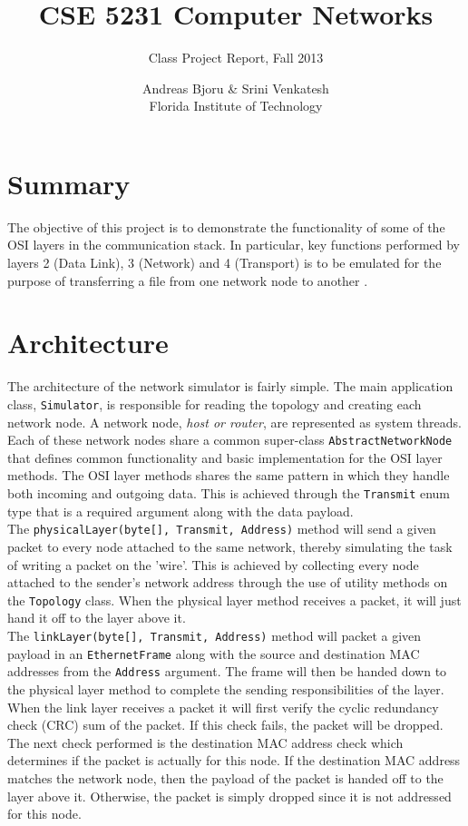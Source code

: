 \documentclass{scrartcl}
\begin{document}
\author{Andreas Bjoru \& Srini Venkatesh\\ Florida Institute of Technology}
\title{CSE 5231 Computer Networks}
\subtitle{Class Project Report, Fall 2013}
\renewcommand{\today}{November 26, 2013}
\maketitle
\tableofcontents
\newpage

\section{Summary}
The objective of this project is to demonstrate the functionality of some of the OSI layers in the communication stack. In particular, key functions performed by layers 2 (Data Link), 3 (Network) and 4 (Transport) is to be emulated for the purpose of transferring a file from one network node to another \cite{assignment}. 

\section{Architecture}
The architecture of the network simulator is fairly simple. The main application class, \texttt{Simulator}, is responsible for reading the topology and creating each network node. A network node, \textit{host or router}, are represented as system threads. Each of these network nodes share a common super-class \texttt{AbstractNetworkNode} that defines common functionality and basic implementation for the OSI layer methods. The OSI layer methods shares the same pattern in which they handle both incoming and outgoing data. This is achieved through the \texttt{Transmit} enum type that is a required argument along with the data payload. \\

The \texttt{physicalLayer(byte[], Transmit, Address)} method will send a given packet to every node attached to the same network, thereby simulating the task of writing a packet on the 'wire'. This is achieved by collecting every node attached to the sender's network address through the use of utility methods on the \texttt{Topology} class. When the physical layer method receives a packet, it will just hand it off to the layer above it.\\

The \texttt{linkLayer(byte[], Transmit, Address)} method will packet a given payload in an \texttt{EthernetFrame} along with the source and destination MAC addresses from the \texttt{Address} argument. The frame will then be handed down to the physical layer method to complete the sending responsibilities of the layer. When the link layer receives a packet it will first verify the cyclic redundancy check (CRC) sum of the packet. If this check fails, the packet will be dropped. The next check performed is the destination MAC address check which determines if the packet is actually for this node. If the destination MAC address matches the network node, then the payload of the packet is handed off to the layer above it. Otherwise, the packet is simply dropped since it is not addressed for this node.
\end{document}

